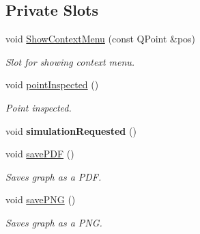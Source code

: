 \subsection*{Private Slots}
\begin{DoxyCompactItemize}
\item 
void \hyperlink{classSGCustomPlot_a9e8312d8b4cc19d53bc8790b71f3e8ed}{Show\+Context\+Menu} (const Q\+Point \&pos)
\begin{DoxyCompactList}\small\item\em Slot for showing context menu. \end{DoxyCompactList}\item 
\mbox{\label{classSGCustomPlot_ab63f0da26acab2aa7295d44c9a3d5203}} 
void \hyperlink{classSGCustomPlot_ab63f0da26acab2aa7295d44c9a3d5203}{point\+Inspected} ()
\begin{DoxyCompactList}\small\item\em Point inspected. \end{DoxyCompactList}\item 
\mbox{\label{classSGCustomPlot_a6068b1ffa202245fa8eeb594e6860bb9}} 
void {\bfseries simulation\+Requested} ()
\item 
\mbox{\label{classSGCustomPlot_a9108592865d386c9fafaeac1b813848c}} 
void \hyperlink{classSGCustomPlot_a9108592865d386c9fafaeac1b813848c}{save\+P\+DF} ()
\begin{DoxyCompactList}\small\item\em Saves graph as a P\+DF. \end{DoxyCompactList}\item 
\mbox{\label{classSGCustomPlot_a18f01b1582f9b0415f4b32841846c8dc}} 
void \hyperlink{classSGCustomPlot_a18f01b1582f9b0415f4b32841846c8dc}{save\+P\+NG} ()
\begin{DoxyCompactList}\small\item\em Saves graph as a P\+NG. \end{DoxyCompactList}\end{DoxyCompactItemize}
